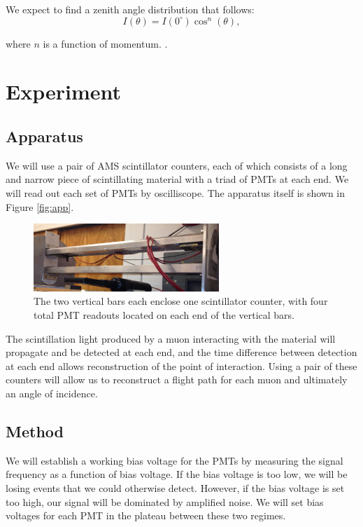 We expect to find a zenith angle distribution that follows:
\begin{equation}
\label{eqn:cosn}
I(\theta)=I(0^\circ)\cos^{n}(\theta),
\end{equation} 

where $n$ is a function of momentum. \cite{grieson}.

\section{Experiment}

\subsection{Apparatus}

We will use a pair of AMS scintillator counters, each of which consists of a long and narrow piece of scintillating material with a triad of PMTs at each end. We will read out each set of PMTs by oscilliscope. The apparatus itself is shown in Figure \ref{fig:app}.

\begin{figure}[htb]
\includegraphics[width=7cm]{apparatus.JPG}
\caption{The two vertical bars each enclose one scintillator counter, with four total PMT readouts located on each end of the vertical bars.}
\label{fig:apparatus}
\end{figure}

The scintillation light produced by a muon interacting with the material will propagate and be detected at each end, and the time difference between detection at each end allows reconstruction of the point of interaction. Using a pair of these counters will allow us to reconstruct a flight path for each muon and ultimately an angle of incidence.

\subsection{Method}

We will establish a working bias voltage for the PMTs by measuring the signal frequency as a function of bias voltage. If the bias voltage is too low, we will be losing events that we could otherwise detect. However, if the bias voltage is set too high, our signal will be dominated by amplified noise. We will set bias voltages for each PMT in the plateau between these two regimes.

